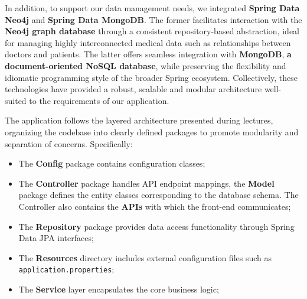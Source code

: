 In addition, to support our data management needs, we integrated \textbf{Spring Data Neo4j} and \textbf{Spring Data MongoDB}. The former facilitates interaction with the \textbf{Neo4j graph database} through a consistent repository-based abstraction, ideal for managing highly interconnected medical data such as relationships between doctors and patients. The latter offers seamless integration with \textbf{MongoDB}, \textbf{a document-oriented NoSQL database}, while preserving the flexibility and idiomatic programming style of the broader Spring ecosystem. Collectively, these technologies have provided a robust, scalable and modular architecture well-suited to the requirements of our application. 

\vspace{4mm}

The application follows the layered architecture presented during lectures, organizing the codebase into clearly defined packages to promote modularity and separation of concerns. Specifically: 
\begin{itemize}
	\item The \textbf{Config} package contains configuration classes;
	\item The \textbf{Controller} package handles API endpoint mappings, the \textbf{Model} package defines the entity classes corresponding to the database schema. The Controller also contains the \textbf{APIs} with which the front-end communicates;
	\item The \textbf{Repository} package provides data access functionality through Spring Data JPA interfaces;
	\item The \textbf{Resources} directory includes external configuration files such as \texttt{application.properties};
	\item The \textbf{Service} layer encapsulates the core business logic;
\end{itemize}






